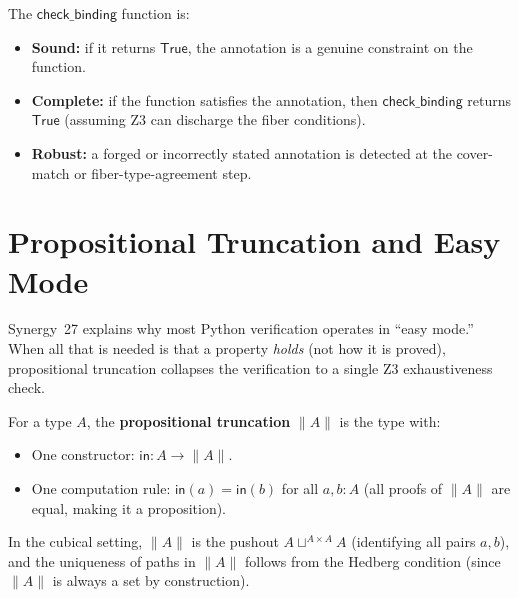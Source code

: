 \begin{corollary}
\label{cor:check-binding}
The $\mathsf{check\_binding}$ function is:
\begin{itemize}
\item \textbf{Sound:} if it returns $\mathsf{True}$, the annotation is
  a genuine constraint on the function.
\item \textbf{Complete:} if the function satisfies the annotation, then
  $\mathsf{check\_binding}$ returns $\mathsf{True}$ (assuming Z3
  can discharge the fiber conditions).
\item \textbf{Robust:} a forged or incorrectly stated annotation is
  detected at the cover-match or fiber-type-agreement step.
\end{itemize}
\end{corollary}


\section{Propositional Truncation and Easy Mode}
\label{sec:truncation-easy}

Synergy~27 explains why most Python verification operates in ``easy mode.''
When all that is needed is that a property \emph{holds} (not how it is proved),
propositional truncation collapses the verification to a single Z3
exhaustiveness check.

\begin{definition}
\label{def:truncation}
For a type $A$, the \textbf{propositional truncation} $\|A\|$ is
the type with:
\begin{itemize}
\item One constructor: $\mathsf{in} : A \to \|A\|$.
\item One computation rule: $\mathsf{in}(a) = \mathsf{in}(b)$ for all
  $a, b : A$ (all proofs of $\|A\|$ are equal, making it a proposition).
\end{itemize}
In the cubical setting, $\|A\|$ is the pushout
$A \sqcup^{A \times A} A$ (identifying all pairs $a, b$), and
the uniqueness of paths in $\|A\|$ follows from the Hedberg condition
(since $\|A\|$ is always a set by construction).
\end{definition}

